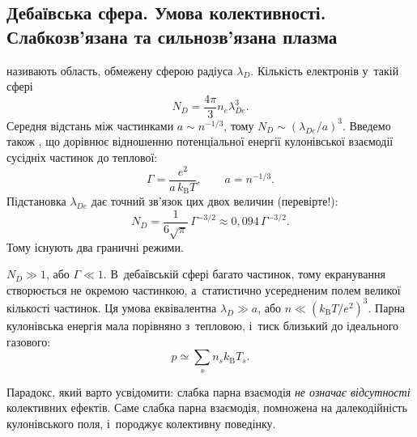 \subsection*{Дебаївська сфера. Умова колективності. Слабкозв'язана та сильнозв'язана плазма}


 називають область, обмежену сферою радіуса $\lambda_D$.
Кількість електронів у~такій сфері
\begin{equation}\label{eq:debye-number}
	N_D=\frac{4\pi}3n_e\lambda_{De}^3.
\end{equation}
Середня відстань між частинками $a\sim n^{-1/3}$, тому $N_D\sim(\lambda_{De}/a)^3$.
Введемо також , що дорівнює відношенню потенціальної енергії
кулонівської взаємодії сусідніх частинок до теплової:
\begin{equation}\label{eq:coupling}
	\Gamma=\frac{e^2}{a\,k_{\mathrm B}T},\qquad a=n^{-1/3}.
\end{equation}
Підстановка $\lambda_{De}$ дає точний зв'язок цих двох величин (перевірте!):
\begin{equation}\label{eq:ND-Gamma}
	N_D=\frac1{6\sqrt\pi}\,\Gamma^{-3/2}\approx0{,}094\,\Gamma^{-3/2}.
\end{equation}
Тому існують два граничні режими.

 $N_D\gg1$, або $\Gamma\ll1$.
В~дебаївській сфері багато частинок, тому екранування створюється не окремою частинкою,
а~статистично усередненим полем великої кількості частинок. Ця умова еквівалентна
$\lambda_D\gg a$, або $n\ll(k_{\mathrm B}T/e^2)^3$. Парна кулонівська енергія мала
порівняно з~тепловою, і~тиск близький до ідеального газового:
\begin{equation}\label{eq:ideal-pressure}
	p\simeq\sum_sn_sk_{\mathrm B}T_s.
\end{equation}
\begin{Attention}
	Парадокс, який варто усвідомити: слабка парна взаємодія \emph{не означає відсутності}
	колективних ефектів. Саме слабка парна взаємодія, помножена на далекодійність
	кулонівського поля, і~породжує колективну поведінку.
\end{Attention}

